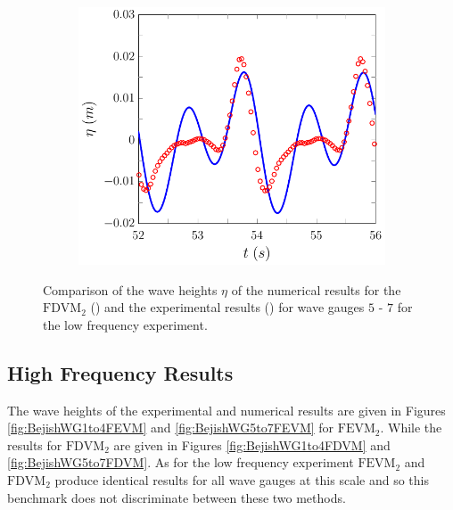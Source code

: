 \begin{figure}
\begin{subfigure}{0.5\textwidth}
		\vspace{0.5cm}
	\end{subfigure}
	\begin{subfigure}{0.5\textwidth}
		\includegraphics[width=\textwidth]{./chp6/figures/Experiment/Beji/sl/FDVMWG7.pdf}
		\vspace{0.5cm}
	\end{subfigure}
	\caption{Comparison of the wave heights $\eta$ of the numerical results for the $\text{FDVM}_2$ ({\color{blue}\solidrule}) and the experimental results () for wave gauges $5$ - $7$ for the low frequency experiment.}
	\label{fig:BejislWG5to7FDVM}
\end{figure}

\subsection{High Frequency Results}
The wave heights of the experimental and numerical results are given in Figures \ref{fig:BejishWG1to4FEVM} and \ref{fig:BejishWG5to7FEVM} for $\text{FEVM}_2$. While the results for $\text{FDVM}_2$ are given in Figures \ref{fig:BejishWG1to4FDVM} and \ref{fig:BejishWG5to7FDVM}. As for the low frequency experiment $\text{FEVM}_2$ and $\text{FDVM}_2$ produce identical results for all wave gauges at this scale and so this benchmark does not discriminate between these two methods. 

